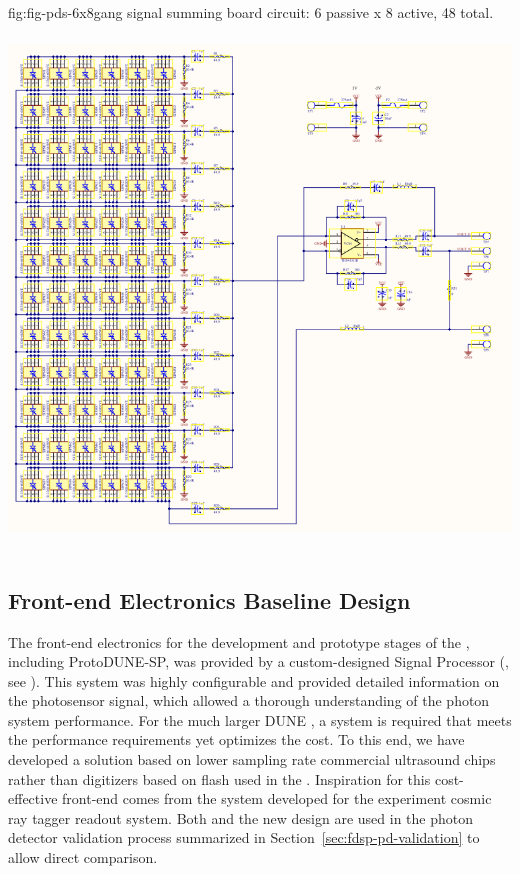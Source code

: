 \begin{dunefigure}
 {fig:fig-pds-6x8gang}
 { signal summing board circuit: 6 passive  x 8 active, 48  total.}
\includegraphics[height=14cm]{graphics/pds_gang_fig2.png}
\end{dunefigure}


\subsection{Front-end Electronics Baseline Design}
\label{sec:electronics}

The front-end electronics for the development and prototype stages of the  , including ProtoDUNE-SP, was provided by a custom-designed  Signal Processor (, see ). This system was highly configurable and provided detailed information on the photosensor signal, which allowed a thorough understanding of the photon system performance.
For the much larger DUNE , a system is required that meets the performance requirements yet optimizes the cost.
To this end, we have developed a solution based on lower sampling rate commercial ultrasound  chips rather than digitizers based on flash  used in the . Inspiration for this cost-effective front-end comes from the system developed for the  experiment cosmic ray tagger readout system.
Both  and the new design are used in the photon detector validation process summarized in Section~\ref{sec:fdsp-pd-validation} to allow direct comparison.

